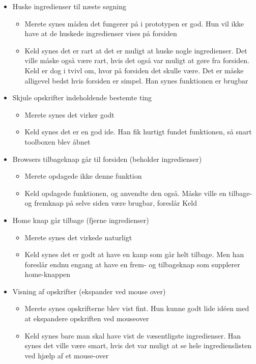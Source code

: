 \begin{description}
\begin{itemize}[noitemsep]
\item Huske ingredienser til næste søgning
\begin{itemize}[noitemsep]
\item Merete synes måden det fungerer på i prototypen er god. Hun vil ikke have at de huskede ingredienser vises på forsiden
\item Keld synes det er rart at det er muligt at huske nogle ingredienser. Det ville måske også være rart, hvis det også var muligt at gøre fra forsiden. Keld er dog i tvivl om, hvor på forsiden det skulle være. Det er måske alligevel bedst hvis forsiden er simpel. Han synes funktionen er brugbar
\end{itemize}
\item Skjule opskrifter indeholdende bestemte ting
\begin{itemize}[noitemsep]
\item Merete synes det virker godt
\item Keld synes det er en god ide. Han fik hurtigt fundet funktionen, så snart toolboxen blev åbnet
\end{itemize}
\item Browsers tilbageknap går til forsiden (beholder ingredienser)
\begin{itemize}[noitemsep]
\item Merete opdagede ikke denne funktion
\item Keld opdagede funktionen, og anvendte den også. Måske ville en tilbage- og fremknap på selve siden være brugbar, foreslår Keld
\end{itemize}
\item Home knap går tilbage (fjerne ingredienser)
\begin{itemize}[noitemsep]
\item Merete synes det virkede naturligt
\item Keld synes det er godt at have en kanp som går helt tilbage. Men han foreslår endnu engang at have en frem- og tilbageknap som supplerer home-knappen
\end{itemize}
\item Visning af opskrifter (ekspander ved mouse over)
\begin{itemize}[noitemsep]
\item Merete synes opskrifterne blev vist fint. Hun kunne godt lide idéen med at ekspandere opskriften ved mouseover
\item Keld synes bare man skal have vist de væsentligste ingredienser. Han synes det ville være smart, hvis det var muligt at se hele ingredienslisten ved hjælp af et mouse-over

\end{itemize}
\end{itemize}
\end{description}
